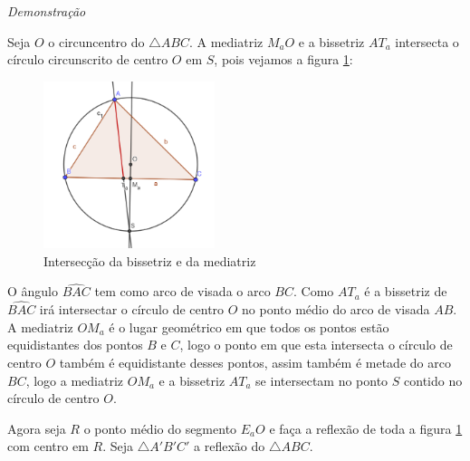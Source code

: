 \documentclass[12pt, openright, a4paper, brazil, openany, oneside]{abntex2}
\begin{document}
\textit{Demonstração}

Seja $O$ o circuncentro do $\triangle ABC$. A mediatriz $M_{a}O$ e a bissetriz $AT_a$ intersecta o círculo circunscrito de centro $O$ em $S$, pois vejamos a figura \ref{trianbismed}:

\begin{figure}[h]
	
	\center
	
	\includegraphics[width=5cm]{triangulocirc.png}
	\caption{Intersecção da bissetriz e da mediatriz\label{trianbismed}}
	
\end{figure}

O ângulo $\hat{BAC}$ tem como arco de visada o arco $BC$. Como $AT_a$ é a bissetriz de $\hat{BAC}$ irá intersectar o círculo de centro $O$ no ponto médio do arco de visada $AB$. A mediatriz $OM_a$ é o lugar geométrico em que todos os pontos estão equidistantes dos pontos $B$ e $C$, logo o ponto em que esta intersecta o círculo de centro $O$ também é equidistante desses pontos, assim também é metade do arco $BC$, logo a mediatriz $OM_a$ e a bissetriz $AT_a$ se intersectam no ponto $S$ contido no círculo de centro $O$.

Agora seja $R$ o ponto médio do segmento $E_{a}O$ e faça a reflexão de toda a figura \ref{trianbismed} com centro em $R$. Seja $\triangle A'B'C'$ a reflexão do $\triangle ABC$.
\end{document}
